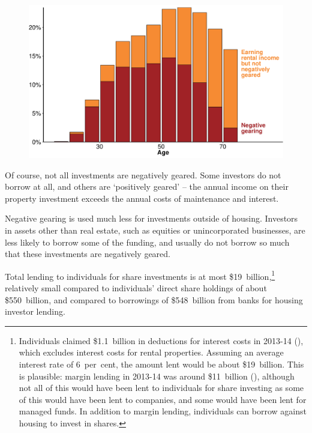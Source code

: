 \begin{figure}

\includegraphics[width=1.22\columnwidth]{./CGT-NG-atlas/NG-PG-by-age-protrude.pdf}

\end{figure}

Of course, not all investments are negatively geared. Some investors do not borrow at all, and others are ‘positively geared’ – the annual income on their property investment exceeds the annual costs of maintenance and interest. 
  
  Negative gearing is used much less for investments outside of housing. Investors in assets other than real estate, such as equities or unincorporated businesses, are less likely to borrow some of the funding, and usually do not borrow so much that these investments are negatively geared. 

Total lending to individuals for share investments is at most \$19~billion,\footnote{Individuals claimed \$1.1~billion in deductions for interest costs in 2013-14 (\textcite[][Table 12]{ATOTaxstats201314}), which excludes interest costs for rental properties. Assuming an average interest rate of 6~per~cent, the amount lent would be about \$19~billion. This is plausible: margin lending in 2013-14 was around \$11~billion (\textcite{RBA2015StatsMarginLending}), although not all of this would have been lent to individuals for share investing as some of this would have been lent to companies, and some would have been lent for managed funds. In addition to margin lending, individuals can borrow against housing to invest in shares.} relatively small compared to individuals’ direct share holdings of about \$550~billion,  and compared to borrowings of \$548~billion from banks for housing investor lending.  


